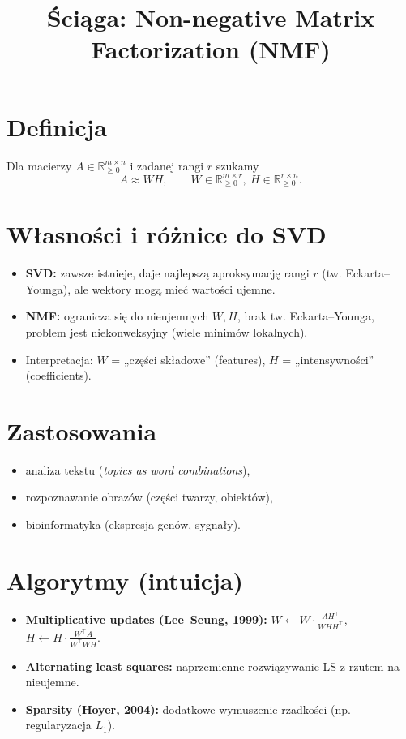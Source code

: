 \documentclass[12pt]{article}
\title{Ściąga: Non-negative Matrix Factorization (NMF)}
\author{}
\date{}
\begin{document}
\maketitle

\section*{Definicja}
Dla macierzy $A\in \mathbb{R}^{m\times n}_{\ge 0}$ i zadanej rangi $r$ szukamy
\[
A \approx WH, \qquad
W\in \mathbb{R}^{m\times r}_{\ge 0},\ H\in \mathbb{R}^{r\times n}_{\ge 0}.
\]

\section*{Własności i różnice do SVD}
\begin{itemize}
  \item \textbf{SVD:} zawsze istnieje, daje najlepszą aproksymację rangi $r$ (tw. Eckarta--Younga), ale wektory mogą mieć wartości ujemne.
  \item \textbf{NMF:} ogranicza się do nieujemnych $W,H$, brak tw. Eckarta--Younga, problem jest niekonweksyjny (wiele minimów lokalnych).
  \item Interpretacja: $W$ = „części składowe” (features), $H$ = „intensywności” (coefficients).
\end{itemize}

\section*{Zastosowania}
\begin{itemize}
  \item analiza tekstu (\emph{topics as word combinations}),
  \item rozpoznawanie obrazów (części twarzy, obiektów),
  \item bioinformatyka (ekspresja genów, sygnały).
\end{itemize}

\section*{Algorytmy (intuicja)}
\begin{itemize}
  \item \textbf{Multiplicative updates (Lee--Seung, 1999):}
        $W \gets W \cdot \frac{AH^\top}{WHH^\top}$,
        $H \gets H \cdot \frac{W^\top A}{W^\top WH}$.
  \item \textbf{Alternating least squares:} naprzemienne rozwiązywanie LS z rzutem na nieujemne.
  \item \textbf{Sparsity (Hoyer, 2004):} dodatkowe wymuszenie rzadkości (np. regularyzacja $L_1$).
\end{itemize}
\end{document}
